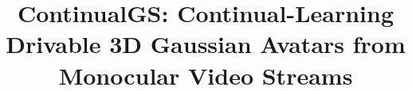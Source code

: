 \documentclass[conference,10pt]{IEEEtran}
\newcommand{\method}{ContinualGS}
\begin{document}
\title{\method{}: Continual-Learning Drivable 3D Gaussian Avatars from Monocular Video Streams}

\author{
}

\maketitle










\end{document}
